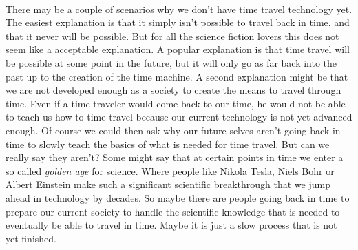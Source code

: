\paragraph{}
There may be a couple of scenarios why we don't have time travel technology yet. The easiest explanation is that it simply isn't possible to travel back in time, and that it never will be possible. But for all the science fiction lovers this does not seem like a acceptable explanation. A popular explanation is that time travel will be possible at some point in the future, but it will only go as far back into the past up to the creation of the time machine.
A second explanation might be that we are not developed enough as a society to create the means to travel through time. Even if a time traveler would come back to our time, he would not be able to teach us how to time travel because our current technology is not yet advanced enough. Of course we could then ask why our future selves aren't going back in time to slowly teach the basics of what is needed for time travel. But can we really say they aren't? Some might say that at certain points in time we enter a so called \emph{golden age} for science. Where people like Nikola Tesla, Niels Bohr or Albert Einstein make such a significant scientific breakthrough that we jump ahead in technology by decades. So maybe there are people going back in time to prepare our current society to handle the scientific knowledge that is needed to eventually be able to travel in time. Maybe it is just a slow process that is not yet finished.


